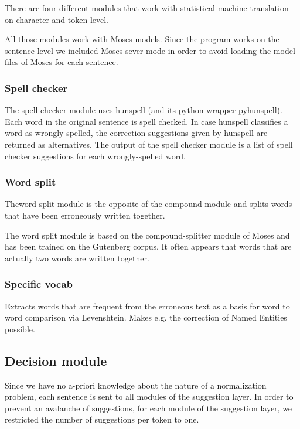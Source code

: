 \documentclass[letterpaper,10pt,english]{sphinxmanual}
\begin{document}
There are four different modules that work with statistical machine translation on character and token level.

All those modules work with Moses models. Since the program works on the sentence level we included Moses sever mode in order to avoid loading the model files of Moses for each sentence.


\subsubsection{Spell checker}
\label{\detokenize{README:spell-checker}}
The spell checker module uses hunspell (and its python wrapper pyhunspell). Each word in the original sentence is spell checked.
In case hunspell classifies a word as wrongly-spelled, the correction suggestions given by hunspell are returned as alternatives.
The output of the spell checker module is a list of spell checker suggestions for each wrongly-spelled word.


\subsubsection{Word split}
\label{\detokenize{README:word-split}}
Theword split module is the opposite of the compound module and splits words that have been erroneously written together.

The word split module is based on the compound-splitter module of Moses  and has been trained on the Gutenberg corpus.
It often appears that words that are actually two words are written together.


\subsubsection{Specific vocab}
\label{\detokenize{README:specific-vocab}}
Extracts words that are frequent from the erroneous text as a basis for word to word comparison via Levenshtein. Makes e.g. the correction of Named Entities possible.


\subsection{Decision module}
\label{\detokenize{README:decision-module}}
Since we have no a-priori knowledge about the nature of a normalization problem, each sentence is sent to all modules of the suggestion  layer. In order to prevent an avalanche of suggestions, for each module of the suggestion layer, we restricted the number of suggestions per token to one.
\end{document}
